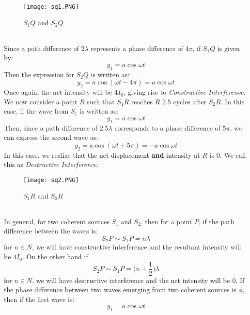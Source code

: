 \documentclass{article}
\begin{document}
\begin{figure}[htp]
    \centering
    \texttt{[image: sq1.PNG]}
    \caption{$S_{1}Q$ and $S_{2}Q$}
    \label{fig:galaxy}
\end{figure}\\
Since a path difference of $2\lambda$ represents a phase difference of $4\pi$, if $S_{1}Q$ is given by:
\begin{equation*}
    y_{1} = a\cos{\omega t}
\end{equation*}
Then the expression for $S_{2}Q$ is written as:
\begin{equation*}
    y_{2} = a\cos{(\omega t - 4\pi)} = a\cos{\omega t}
\end{equation*}
Once again, the net intensity will be $4I_{0}$, giving rise to \emph{Constructive Interference}. 
\newpage
We now consider a point $R$ such that $S_{1}R$ reaches $R$ 2.5 cycles after $S_{2}R$. In this case, if the wave from $S_{1}$ is written as:
\begin{equation*}
    y_{1} = a\cos{\omega t}
\end{equation*}
Then, since a path difference of $2.5\lambda$ corresponds to a phase difference of $5\pi$, we can express the second wave as:
\begin{equation*}
    y_{2} = a\cos{(\omega t + 5\pi)} = -a\cos{\omega t}
\end{equation*}
In this case, we realize that the net displacement \textbf{and} intensity at $R$ is 0. We call this as \emph{Destructive Interference}.
\begin{figure}[htp]
    \centering
    \texttt{[image: sq2.PNG]}
    \caption{$S_{1}R$ and $S_{2}R$}
    \label{fig:galaxy}
\end{figure}\\
In general, for two coherent sources $S_{1}$ and $S_{2}$, then for a point $P$, if the path difference between the waves is:
\begin{equation*}
    S_{2}P \sim S_{1}P = n \lambda 
\end{equation*}
for $n \in N$, we will have constructive interference and the resultant intensity will be $4I_{0}$. On the other hand if
\begin{equation*}
    S_{2}P \sim S_{1}P = \big(n + \frac{1}{2})\lambda
\end{equation*}
for $n \in N$, we will have destructive interference and the net intensity will be 0. 
\newpage
If the phase difference between two waves emerging from two coherent sources is $\phi$, then if the first wave is:
\begin{equation*}
    y_{1} = a\cos{\omega t}
\end{equation*}
\end{document}
